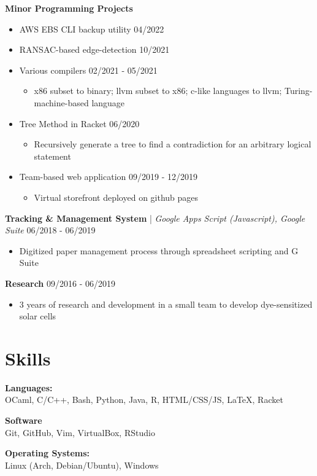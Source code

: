 \documentclass[10pt,letterpaper]{article}
\begin{document}
    \textbf{Minor Programming Projects}\hfill
    \begin{itemize}
      \item AWS EBS CLI backup utility \hfill 04/2022
      \item RANSAC-based edge-detection \hfill 10/2021
      \item Various compilers \hfill 02/2021 - 05/2021
        \begin{itemize}
          \item x86 subset to binary; llvm subset to x86; c-like languages to llvm; Turing-machine-based language
        \end{itemize}
      \item Tree Method in Racket \hfill 06/2020
        \begin{itemize}
          \item Recursively generate a tree to find a contradiction for an arbitrary logical statement
        \end{itemize}
      \item Team-based web application \hfill 09/2019 - 12/2019
        \begin{itemize}
          \item Virtual storefront deployed on github pages
        \end{itemize}
    \end{itemize}

    \textbf{Tracking \& Management System} | \textit{Google Apps Script (Javascript), Google Suite}\hfill
      06/2018 - 06/2019
      \begin{itemize}
        \item Digitized paper management process through spreadsheet scripting and G Suite
      \end{itemize}

    \textbf{Research}\hfill
    09/2016 - 06/2019
    \begin{itemize}
      \item 3 years of research and development in a small team to develop dye-sensitized solar cells
    \end{itemize}
    
  \section{Skills}
    \textbf{Languages:}\\
    OCaml, C/C++, Bash, Python, Java, R, HTML/CSS/JS, LaTeX, Racket
    
    \begin{minipage}[t]{3in}
      \textbf{Software}\\
      Git, GitHub, Vim, VirtualBox, RStudio
    \end{minipage}\hfill
    \begin{minipage}[t]{2.5in}
      \textbf{Operating Systems:}\\
      Linux (Arch, Debian/Ubuntu), Windows
    \end{minipage}
    
\end{document}
